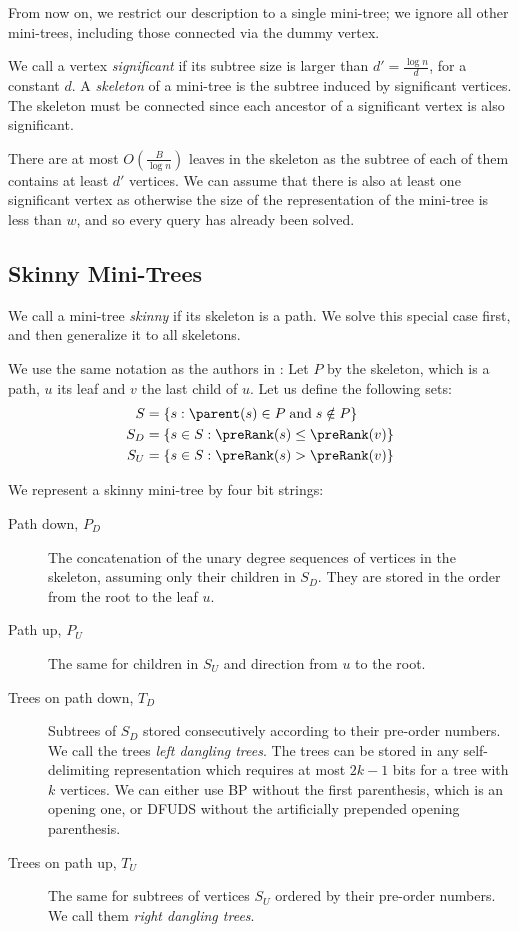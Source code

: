 \bigbreak

From now on, we restrict our description to a single mini-tree; we ignore all other mini-trees, including those connected via the dummy vertex.

We call a vertex \emph{significant} if its subtree size is larger than $d' = \frac{\log n}{d}$, for a constant $d$.
A \emph{skeleton} of a mini-tree is the subtree induced by significant vertices.
The skeleton must be connected since each ancestor of a significant vertex is also significant.

There are at most $O\left(\frac{B}{\log n}\right)$ leaves in the skeleton as the subtree of each of them contains at least $d'$ vertices.
We can assume that there is also at least one significant vertex as otherwise the size of the representation of the mini-tree is less than $w$, and so every query has already been solved.

\subsection{Skinny Mini-Trees}

We call a mini-tree \emph{skinny} if its skeleton is a path.
We solve this special case first, and then generalize it to all skeletons.

We use the same notation as the authors in \cite{farzan2009universal}:
Let $P$ by the skeleton, which is a path, $u$ its leaf and $v$ the last child of $u$.
Let us define the following sets:
\begin{align*}
	S &= \{ s : \parent(s) \in P \booland s \notin P \} \\
	S_D &= \{ s \in S : \preRank(s) \le \preRank(v) \} \\
	S_U &= \{ s \in S : \preRank(s) > \preRank(v) \}
\end{align*}

We represent a skinny mini-tree by four bit strings:
\begin{description}
	\item[Path down, $P_D$]
	The concatenation of the unary degree sequences of vertices in the skeleton, assuming only their children in $S_D$.
	They are stored in the order from the root to the leaf $u$.
	
	\item[Path up, $P_U$]
	The same for children in $S_U$ and direction from $u$ to the root.
	
	\item[Trees on path down, $T_D$]
	Subtrees of $S_D$ stored consecutively according to their pre-order numbers.
	We call the trees \emph{left dangling trees}.
	The trees can be stored in any self-delimiting representation which requires at most $2k - 1$ bits for a tree with $k$ vertices.
	We can either use BP without the first parenthesis, which is an opening one, or DFUDS without the artificially prepended opening parenthesis.
	
	\item[Trees on path up, $T_U$]
	The same for subtrees of vertices $S_U$ ordered by their pre-order numbers.
	We call them \emph{right dangling trees}.
\end{description}

